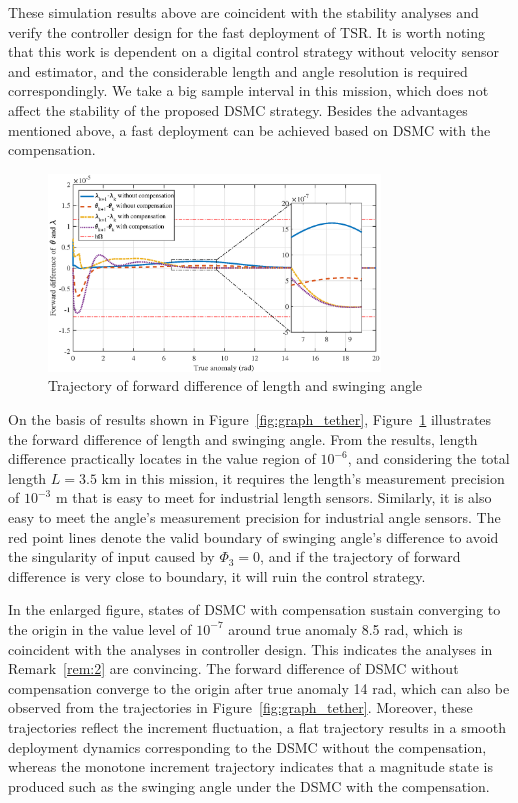 \documentclass[10pt,final,journal]{IEEEtran}
\begin{document}
These simulation results above are coincident with the stability analyses and verify the controller design for the fast deployment of TSR. It is worth noting that this work is dependent on a digital control strategy without velocity sensor and estimator, and the considerable length and angle resolution is required correspondingly. We take a big sample interval in this mission, which does not affect the stability of the proposed DSMC strategy. Besides the advantages mentioned above, a fast deployment can be achieved based on DSMC with the compensation. 

\begin{figure}[htbp] 
\centering
\includegraphics[width=250pt]{forwarddifference.eps}
\caption{Trajectory of forward difference of length and swinging angle} \label{fig:graph_diff}
\end{figure}

On the basis of results shown in Figure~\ref{fig:graph_tether}, Figure~\ref{fig:graph_diff} illustrates the forward difference of length and swinging angle. From the results, length difference practically locates in the value region of $10^{-6}$, and considering the total length $L=3.5$ km in this mission, it requires the length's measurement precision of $10^{-3} $ m that is easy to meet for industrial length sensors. Similarly, it is also easy to meet the angle's measurement precision for industrial angle sensors. The red point lines denote the valid boundary of swinging angle's difference to avoid the singularity of input caused by $\Phi_3=0$, and if the trajectory of forward difference is very close to boundary, it will ruin the control strategy. 

In the enlarged figure, states of DSMC with compensation sustain converging to the origin in the value level of $10^{-7}$ around true anomaly 8.5 rad, which is coincident with the analyses in controller design. This indicates the analyses in Remark~\ref{rem:2} are convincing. The forward difference of DSMC without compensation converge to the origin after true anomaly 14 rad, which can also be observed from the trajectories in Figure~\ref{fig:graph_tether}. Moreover, these trajectories reflect the increment fluctuation, a flat trajectory results in a smooth deployment dynamics corresponding to the DSMC without the compensation, whereas the monotone increment trajectory indicates that a magnitude state is produced such as the swinging angle under the DSMC with the compensation.
\end{document}
